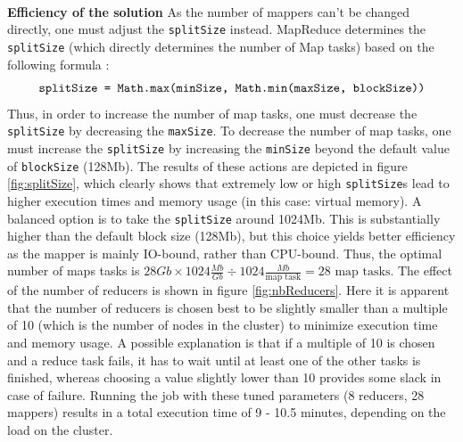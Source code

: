 \documentclass[11pt]{article}
\begin{document}
\noindent\\\textbf{Efficiency of the solution}
As the number of mappers can't be changed directly, one must adjust the \texttt{splitSize} instead. MapReduce determines the \texttt{splitSize} (which directly determines the number of Map tasks) based on the following formula \cite{Hadoop}:
\begin{equation*}
\texttt{\text{splitSize = Math.max(minSize, Math.min(maxSize, blockSize))}}
\end{equation*}
Thus, in order to increase the number of map tasks, one must decrease the \texttt{splitSize} by decreasing the \texttt{maxSize}. To decrease the number of map tasks, one must increase the \texttt{splitSize} by increasing the \texttt{minSize} beyond the default value of \texttt{blockSize} (128Mb). The results of these actions are depicted in figure \ref{fig:splitSize}, which clearly shows that extremely low or high \texttt{splitSize}s lead to higher execution times and memory usage (in this case: virtual memory). A balanced option is to take the \texttt{splitSize} around 1024Mb. This is substantially higher than the default block size (128Mb), but this choice yields better efficiency as the mapper is mainly IO-bound, rather than CPU-bound. Thus, the optimal number of maps tasks is $28Gb \times 1024 \frac{Mb}{Gb} \div 1024 \frac{Mb}{\text{map task}} = 28 \text{ map tasks}$. The effect of the number of reducers is shown in figure \ref{fig:nbReducers}. Here it is apparent that the number of reducers is chosen best to be slightly smaller than a multiple of 10 (which is the number of nodes in the cluster) to minimize execution time and memory usage. A possible explanation is that if a multiple of 10 is chosen and a reduce task fails, it has to wait until at least one of the other tasks is finished, whereas choosing a value slightly lower than 10 provides some slack in case of failure. Running the job with these tuned parameters (8 reducers, 28 mappers) results in a total execution time of 9 - 10.5 minutes, depending on the load on the cluster.
\end{document}
